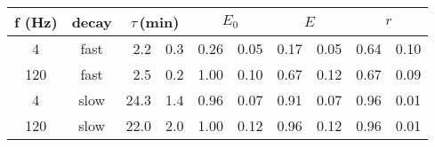 \begin{tabular}{ccr@{$\,\pm\,$}lr@{$\,\pm\,$}lr@{$\,\pm\,$}lr@{$\,\pm\,$}l}
\toprule
f (Hz)
    & decay
		       &\multicolumn{2}{c}{$\tau$\,(min)}
                        & \multicolumn{2}{c}{$E_0$}
                                       & \multicolumn{2}{c}{$E$}
                                                      & \multicolumn{2}{c}{$r$} \\
\midrule

  4 & fast &  2.2 & 0.3 &  0.26 & 0.05 &  0.17 & 0.05 &  0.64 & 0.10 \\
120 & fast &  2.5 & 0.2 &  1.00 & 0.10 &  0.67 & 0.12 &  0.67 & 0.09 \\
  4 & slow & 24.3 & 1.4 &  0.96 & 0.07 &  0.91 & 0.07 &  0.96 & 0.01 \\
120 & slow & 22.0 & 2.0 &  1.00 & 0.12 &  0.96 & 0.12 &  0.96 & 0.01 \\
\bottomrule
\end{tabular}
